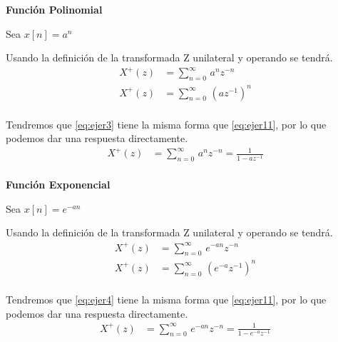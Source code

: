 \documentclass[12pt]{article}
\begin{document}
\textbf{Función Polinomial}
\vspace{5mm} 

Sea $x[n]=a^n$

\vspace{5mm}
Usando la definición de la transformada Z unilateral y operando se tendrá.
\begin{equation}
    \begin{split}
        X^+(z)&=\displaystyle\sum_{n=0}^{\infty}\,a^nz^{-n}\\
        X^+(z)&=\displaystyle\sum_{n=0}^{\infty}\,(az^{-1})^{n}\\
    \end{split}
    \label{eq:ejer3}
\end{equation}

Tendremos que \ref{eq:ejer3} tiene la misma forma que \ref{eq:ejer11}, por lo que podemos dar una respuesta directamente.
\begin{equation}
    \begin{split}
        X^+(z)&=\displaystyle\sum_{n=0}^{\infty}\,a^nz^{-n}=\frac{1}{1-az^{-1}}\\
    \end{split}
    \label{eq:ejer31}
\end{equation}

\textbf{Función Exponencial}
\vspace{5mm} 

Sea $x[n]=e^{-an}$

\vspace{5mm}
Usando la definición de la transformada Z unilateral y operando se tendrá.
\begin{equation}
    \begin{split}
        X^+(z)&=\displaystyle\sum_{n=0}^{\infty}\,e^{-an}z^{-n}\\
        X^+(z)&=\displaystyle\sum_{n=0}^{\infty}\,(e^{-a}z^{-1})^{n}\\
    \end{split}
    \label{eq:ejer4}
\end{equation}

Tendremos que \ref{eq:ejer4} tiene la misma forma que \ref{eq:ejer11}, por lo que podemos dar una respuesta directamente.
\begin{equation}
    \begin{split}
        X^+(z)&=\displaystyle\sum_{n=0}^{\infty}\,e^{-an}z^{-n}=\frac{1}{1-e^{-a}z^{-1}}\\
    \end{split}
    \label{eq:ejer41}
\end{equation}
\end{document}
